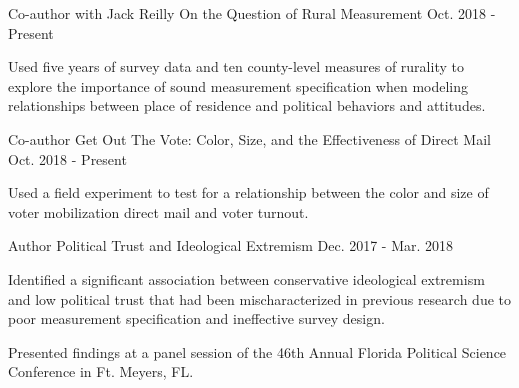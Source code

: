 \begin{cventries}
    \cventry
      {Co-author with Jack Reilly} %
      {On the Question of Rural Measurement} %
      {Oct. 2018 - Present} %
      {} %
      {
        \begin{cvitems} %
          \item {Used five years of survey data and ten county-level measures of rurality to explore the importance of sound measurement specification when modeling relationships between place of residence and political behaviors and attitudes.}
        \end{cvitems}
      }

    \cventry
      {Co-author} %
      {Get Out The Vote: Color, Size, and the Effectiveness of Direct Mail} %
      {Oct. 2018 - Present} %
      {} %
      {
        \begin{cvitems} %
          \item {Used a field experiment to test for a relationship between the color and size of voter mobilization direct mail and voter turnout.}
        \end{cvitems}
      }


    \cventry
      {Author} %
      {Political Trust and Ideological Extremism} %
      {Dec. 2017 - Mar. 2018} %
      {} %
      {
        \begin{cvitems} %
          \item {Identified a significant association between conservative ideological extremism and low political trust that had been mischaracterized in previous research due to poor measurement specification and ineffective survey design.}
          \item {Presented findings at a panel session of the 46th Annual Florida Political Science Conference in Ft. Meyers, FL.}
        \end{cvitems}
      }

\end{cventries}
